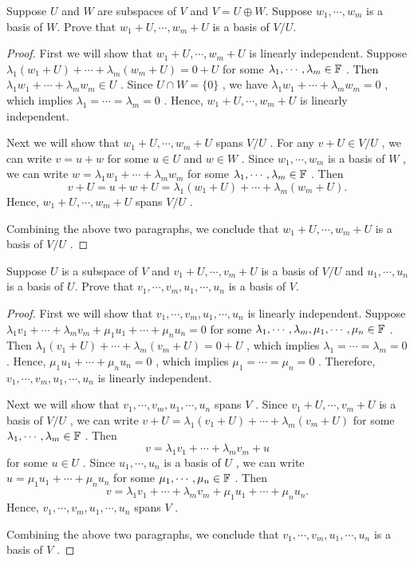 \documentclass{article}
\begin{document}
\begin{problem}[3E-14]
	Suppose $U$ and $W$ are subspaces of $V$ and $V = U \oplus W$. Suppose
	$w_1, \cdots, w_m$ is a basis of $W$. Prove that
	$w_1 + U, \cdots, w_m + U$ is a basis of $V/U$.
\end{problem}

\begin{proof}
	First we will show that \( w_1+U, \cdots, w_m+U \) is linearly independent. Suppose \( \lambda_1(w_1+U)+\cdots+\lambda_m(w_m+U)=0+U \) for some \( \lambda_1,\cdots,\lambda_m\in\mathbb{F} \) . Then \( \lambda_1w_1+\cdots+\lambda_mw_m\in U \) . Since \( U\cap W=\{0\} \) , we have \( \lambda_1w_1+\cdots+\lambda_mw_m=0 \) , which implies \( \lambda_1=\cdots=\lambda_m=0 \) . Hence, \( w_1+U, \cdots, w_m+U \) is linearly independent.\par
	Next we will show that \( w_1+U, \cdots, w_m+U \) spans \( V/U \) . For any \( v+U\in V/U \) , we can write \( v=u+w \) for some \( u\in U \) and \( w\in W \) . Since \( w_1, \cdots, w_m \) is a basis of \( W \) , we can write \( w=\lambda_1w_1+\cdots+\lambda_mw_m \) for some \( \lambda_1,\cdots,\lambda_m\in\mathbb{F} \) . Then
	\[ v+U=u+w+U=\lambda_1(w_1+U)+\cdots+\lambda_m(w_m+U). \]
	Hence, \( w_1+U, \cdots, w_m+U \) spans \( V/U \) .\par
	Combining the above two paragraphs, we conclude that \( w_1+U, \cdots, w_m+U \) is a basis of \( V/U \) .
\end{proof}

\begin{problem}[3E-15]
	Suppose $U$ is a subspace of $V$ and $v_1 + U, \cdots, v_m + U$ is a basis
	of $V/U$ and $u_1, \cdots, u_n$ is a basis of $U$. Prove that
	$v_1, \cdots, v_m, u_1, \cdots, u_n$ is a basis of $V$.
\end{problem}

\begin{proof}
	First we will show that \( v_1, \cdots, v_m, u_1, \cdots, u_n \) is linearly independent. Suppose \( \lambda_1v_1+\cdots+\lambda_mv_m+\mu_1u_1+\cdots+\mu_nu_n=0 \) for some \( \lambda_1,\cdots,\lambda_m,\mu_1,\cdots,\mu_n\in\mathbb{F} \) . Then \( \lambda_1(v_1+U)+\cdots+\lambda_m(v_m+U)=0+U \) , which implies \( \lambda_1=\cdots=\lambda_m=0 \) . Hence, \( \mu_1u_1+\cdots+\mu_nu_n=0 \) , which implies \( \mu_1=\cdots=\mu_n=0 \) . Therefore, \( v_1, \cdots, v_m, u_1, \cdots, u_n \) is linearly independent.\par
	Next we will show that \( v_1, \cdots, v_m, u_1, \cdots, u_n \) spans \( V \) . Since \( v_1+U, \cdots, v_m+U \) is a basis of \( V/U \) , we can write \( v+U=\lambda_1(v_1+U)+\cdots+\lambda_m(v_m+U) \) for some \( \lambda_1,\cdots,\lambda_m\in\mathbb{F} \) . Then
	\[ v=\lambda_1v_1+\cdots+\lambda_mv_m+u \] for some \( u\in U \) . Since \( u_1, \cdots, u_n \) is a basis of \( U \) , we can write \( u=\mu_1u_1+\cdots+\mu_nu_n \) for some \( \mu_1,\cdots,\mu_n\in\mathbb{F} \) . Then
	\[ v=\lambda_1v_1+\cdots+\lambda_mv_m+\mu_1u_1+\cdots+\mu_nu_n. \]
	Hence, \( v_1, \cdots, v_m, u_1, \cdots, u_n \) spans \( V \) .\par
	Combining the above two paragraphs, we conclude that \( v_1, \cdots, v_m, u_1, \cdots, u_n \) is a basis of \( V \) .
\end{proof}
\end{document}
